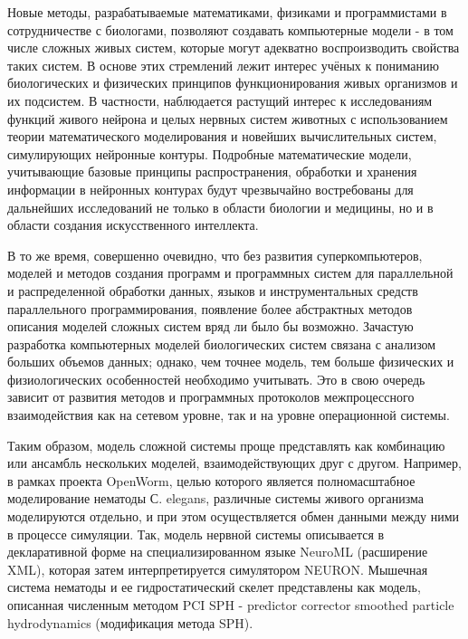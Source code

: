 
{\actuality} Новые методы, разрабатываемые математиками, физиками и программистами в сотрудничестве с биологами, позволяют создавать компьютерные модели - в том числе сложных живых систем, которые могут адекватно воспроизводить свойства таких систем. В основе этих стремлений лежит интерес учёных к пониманию биологических и физических принципов функционирования живых организмов и их подсистем. В частности, наблюдается растущий интерес к исследованиям функций живого нейрона и целых нервных систем животных с использованием теории математического моделирования и новейших вычислительных систем, симулирующих нейронные контуры. Подробные математические модели, учитывающие базовые принципы распространения, обработки и хранения информации в нейронных контурах будут чрезвычайно востребованы для дальнейших исследований не только в области биологии и медицины, но и в области создания искусственного интеллекта.

В то же время, совершенно очевидно, что без развития суперкомпьютеров, моделей и методов создания программ и программных систем для параллельной и распределенной обработки данных, языков и инструментальных средств параллельного программирования, появление более абстрактных методов описания моделей сложных систем вряд ли было бы возможно. Зачастую разработка компьютерных моделей биологических систем связана с анализом больших объемов данных; однако, чем точнее модель, тем больше физических и физиологических особенностей необходимо учитывать. Это в свою очередь зависит от развития методов и программных протоколов межпроцессного взаимодействия как на сетевом уровне, так и на уровне операционной системы.

Таким образом, модель сложной системы проще представлять как комбинацию или ансамбль нескольких моделей, взаимодействующих друг с другом. Например, в рамках проекта OpenWorm, целью которого является полномасштабное моделирование нематоды  С. elegans, различные системы живого организма моделируются отдельно, и при этом осуществляется обмен данными между ними в процессе симуляции. Так, модель нервной системы описывается в декларативной  форме на специализированном языке  NeuroML (расширение XML), которая затем интерпретируется симулятором  NEURON. Мышечная система нематоды и ее гидростатический скелет представлены как модель, описанная численным методом  PCI SPH - predictor corrector smoothed particle hydrodynamics (модификация метода SPH).

